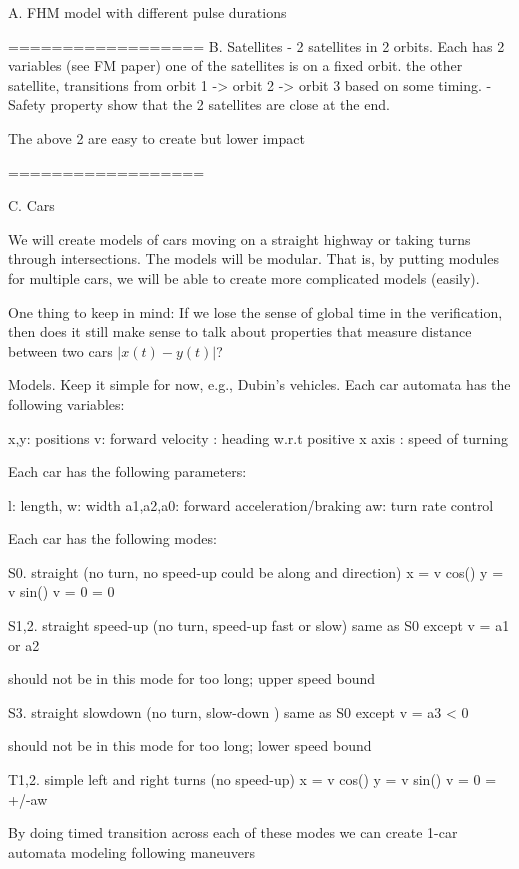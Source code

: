 A. FHM model with different pulse durations 

==================
B. Satellites
- 2 satellites in 2 orbits. Each has 2 variables (see FM paper)
one of the satellites is on a fixed orbit.
the other satellite, transitions from orbit 1 -> orbit 2 -> orbit 3 based on some timing. 
- Safety property show that the 2 satellites are close at the end.

The above 2 are easy to create but lower impact 

==================

C. Cars

We will create models of cars moving on a straight highway or taking turns through intersections. The models will be modular. That is, by putting modules for multiple cars, we will be able to create more complicated models (easily).  

One thing to keep in mind: If we lose the sense of global time in the verification, then does it still make sense to talk about properties that measure distance between two cars $|x(t) - y(t)|$? 

Models. Keep it simple for now, e.g., Dubin's vehicles. Each car automata has the following variables:

x,y: positions
v: forward velocity
\theta: heading w.r.t positive x axis
\omega: speed of turning

Each car has the following parameters:

l: length, w: width
a1,a2,a0: forward acceleration/braking 
aw: turn rate control

Each car has the following modes:

S0. straight (no turn, no speed-up could be along and direction)
\dot x = v cos(\theta)
\dot y = v sin(\theta)
\dot v = 0
\dot \theta = 0


S1,2. straight speed-up (no turn,  speed-up fast or slow)
same as S0 except
\dot v = a1 or a2

should not be in this mode for too long; upper speed bound

S3. straight slowdown (no turn,  slow-down )
same as S0 except
\dot v = a3 < 0

should not be in this mode for too long; lower speed bound

T1,2. simple left and right turns (no speed-up)
\dot x = v cos(\theta)
\dot y = v sin(\theta)
\dot v = 0
\dot \theta = +/-aw

By doing timed transition across each of these modes we can create 1-car automata modeling following maneuvers

